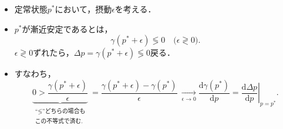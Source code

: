 \documentclass[uplatex,12pt,dvipdfmx,xcolor=svgnames]{beamer}
\newcommand{\bibun}{\mathrm{d}}
\begin{document}
\begin{frame}[t]{\secIII}
	
\begin{itemize}
	\item 定常状態$p^*$において，摂動$\epsilon$を考える．
	\item $p^*$が漸近安定であるとは，
		\begin{equation*}
			\gamma(p^*+\epsilon) \lessgtr 0 
			\quad \big(\epsilon \gtrless 0\big).
		\end{equation*}
		$\epsilon\gtrless0$ずれたら，$\Delta p = \gamma(p^*+\epsilon)\lessgtr0$戻る．
	\item すなわち，
		\begin{equation*}
			\underbrace{0 > \frac{\gamma(p^*+\epsilon)}{\epsilon}}%
			_{\substack{\text{``$\lessgtr$''どちらの場合も}\\ \text{この不等式で済む.}}}
			 \ =
			\frac{\gamma(p^*+\epsilon) - \gamma(p^*)}{\epsilon}\ 
			\xrightarrow[\epsilon\rightarrow 0]{}
			\frac{\bibun \gamma(p^*)}{\bibun p}
			= \left.\frac{\bibun \Delta p}{\bibun p}\right|_{p=p^*}.
		\end{equation*}

\end{itemize}
\end{frame}
\end{document}
